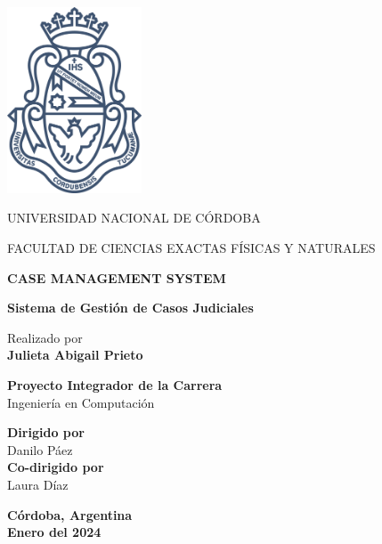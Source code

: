 \begin{center}
\vspace*{1cm}

\includegraphics[width=0.3\textwidth]{fig/logoUNC.png}

\vspace*{1cm}
\begin{large}
UNIVERSIDAD NACIONAL DE CÓRDOBA 

FACULTAD DE CIENCIAS EXACTAS FÍSICAS Y NATURALES
\end{large}


\vspace*{0.1in}
\AddToShipoutPictureBG*{\AtPageLowerLeft{%
  \color{US_red!20}\rule{.25\paperwidth}{\paperheight}}}


\textbf{\huge CASE MANAGEMENT SYSTEM}

{\Large \textbf{Sistema de Gestión de Casos Judiciales}}
        

\vspace*{.2in}

{\large Realizado por}\\
\textbf{\Large Julieta Abigail Prieto} %

\vspace*{1cm}
\begin{mdframed}[style=US_style]
\centering
\textbf{Proyecto Integrador de la Carrera}\\
{\large Ingeniería en Computación} 

\vspace*{0.2in}

\textbf{Dirigido por}\\
{\large Danilo Páez}\\
\vspace*{0.2in}
\textbf{Co-dirigido por}\\
{\large Laura Díaz}\\

\vspace*{0.2in}
\end{mdframed}


\vspace*{.6in}
\textbf{Córdoba, Argentina}\\
\textbf{Enero del 2024}
\vspace*{0.2in}
\end{center}


\thispagestyle{empty} %
\clearpage\setcounter{page}{1} %
